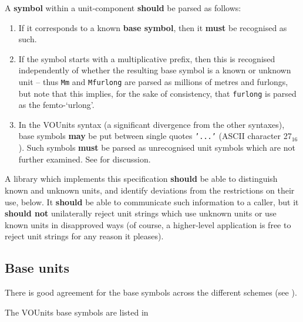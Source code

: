 \documentclass[11pt,notitlepage,onecolumn]{ivoa}
\newcommand*\hex[1]{\uppercase{#1}${}_{16}$}
\newcommand*\norm[1]{\textbf{\color{ivoacolor}#1}}
\newcommand{\unit}[1]{\texttt{\small\color{orange}#1}}
\begin{document}
A \textbf{symbol} within a unit-component \norm{should} be parsed as follows:
\begin{enumerate}
\item If it corresponds to a known \textbf{base symbol}, then it
\norm{must} be recognised as such.

\item If the symbol starts with a multiplicative prefix, then this is
recognised independently of whether the resulting base symbol is a
known or unknown unit -- thus \unit{Mm} and \unit{Mfurlong} are parsed
as millions of metres and furlongs, but note that this implies, for
the sake of consistency, that \unit{furlong} is parsed as the
femto-`urlong'.

\item In the VOUnits syntax (a significant divergence from the other
syntaxes), base symbols \norm{may} be put between single
quotes \unit{'...'} (ASCII character \hex{27}).
Such symbols \norm{must} be parsed as
unrecognised unit symbols which are not further examined.
See  for discussion.
\end{enumerate}

A library which implements this specification \norm{should} be able to
distinguish known and unknown units, and identify deviations from the
restrictions on their use, below.  It \norm{should} be able to
communicate such information to a caller, but it \norm{should not}
unilaterally reject unit strings which use unknown units or use known
units in disapproved ways (of course, a higher-level application is
free to reject unit strings for any reason it pleases).

\subsection{Base units\label{sec:baseUnits}}

There is good agreement for the base symbols across the different schemes
(see ).

The VOUnits base symbols are listed in 
\end{document}
